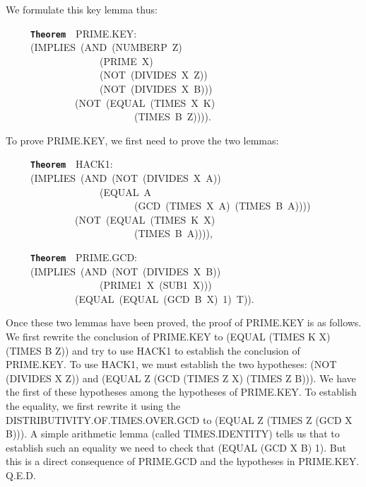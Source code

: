 \documentclass[11pt]{book}
\newenvironment{pubasis}{\begin{flushleft}\ttfamily\small}{\normalsize\rmfamily\end{flushleft}}
\newcommand{\axiomordefinition}[1]{\vspace{6pt}\texttt{\textbf{#1}}}
\begin{document}
We formulate this key lemma thus:
\begin{pubasis}
~~~~~\axiomordefinition{Theorem}~~PRIME.KEY:\\
~~~~~(IMPLIES~(AND~(NUMBERP~Z)\\
~~~~~~~~~~~~~~~~~~~(PRIME~X)\\
~~~~~~~~~~~~~~~~~~~(NOT~(DIVIDES~X~Z))\\
~~~~~~~~~~~~~~~~~~~(NOT~(DIVIDES~X~B)))\\
~~~~~~~~~~~~~~(NOT~(EQUAL~(TIMES~X~K)\\
~~~~~~~~~~~~~~~~~~~~~~~~~~(TIMES~B~Z)))).\\
\end{pubasis}
To prove PRIME.KEY, we  first need to prove the
two lemmas:
\begin{pubasis}
~~~~~\axiomordefinition{Theorem}~~HACK1:\\
~~~~~(IMPLIES~(AND~(NOT~(DIVIDES~X~A))\\
~~~~~~~~~~~~~~~~~~~(EQUAL~A\\
~~~~~~~~~~~~~~~~~~~~~~~~~~(GCD~(TIMES~X~A)~(TIMES~B~A))))\\
~~~~~~~~~~~~~~(NOT~(EQUAL~(TIMES~K~X)\\
~~~~~~~~~~~~~~~~~~~~~~~~~~(TIMES~B~A)))),\\
\end{pubasis}
\begin{pubasis}
~~~~~\axiomordefinition{Theorem}~~PRIME.GCD:\\
~~~~~(IMPLIES~(AND~(NOT~(DIVIDES~X~B))\\
~~~~~~~~~~~~~~~~~~~(PRIME1~X~(SUB1~X)))\\
~~~~~~~~~~~~~~(EQUAL~(EQUAL~(GCD~B~X)~1)~T)).\\
\end{pubasis}
Once these two lemmas have been proved, the proof of
PRIME.KEY is as follows.
We first rewrite the conclusion of PRIME.KEY
to (EQUAL (TIMES K X) (TIMES B Z)) and try to use HACK1 to establish the conclusion
of PRIME.KEY.  To use HACK1, we must establish the two hypotheses:
(NOT (DIVIDES X Z)) and (EQUAL  Z (GCD (TIMES Z X) (TIMES Z B))).
We have the first of these hypotheses among the hypotheses of
PRIME.KEY.  To establish the equality, we first rewrite it
using the DIS\-TRI\-BU\-TIV\-ITY.OF.TIMES.OVER.GCD
to (EQUAL Z (TIMES Z (GCD X B))).  A simple arithmetic lemma
(called TIMES.IDENTITY) tells us that to establish such an equality
we need to check that (EQUAL (GCD X B) 1).  But this is a direct
consequence of PRIME.GCD and the hypotheses in PRIME.KEY. Q.E.D.
\end{document}
